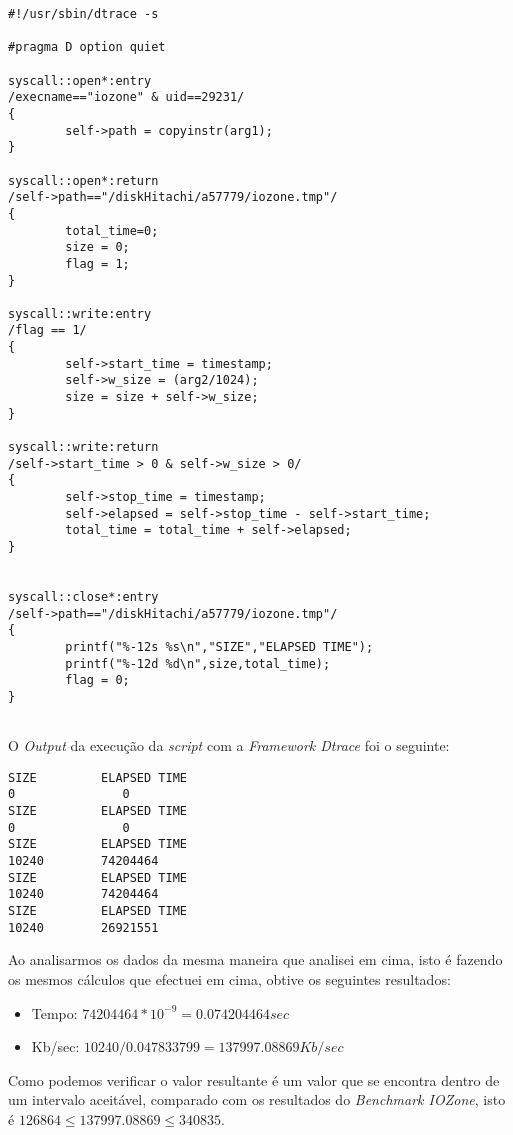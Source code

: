 \documentclass[conference,compsoc]{IEEEtran}
\begin{document}
\begin{lstlisting}
#!/usr/sbin/dtrace -s

#pragma D option quiet

syscall::open*:entry
/execname=="iozone" & uid==29231/
{
        self->path = copyinstr(arg1);
}

syscall::open*:return
/self->path=="/diskHitachi/a57779/iozone.tmp"/
{
        total_time=0;
        size = 0;
        flag = 1; 
}

syscall::write:entry
/flag == 1/
{
        self->start_time = timestamp;
        self->w_size = (arg2/1024);     
        size = size + self->w_size;
}

syscall::write:return
/self->start_time > 0 & self->w_size > 0/
{
        self->stop_time = timestamp;
        self->elapsed = self->stop_time - self->start_time;
        total_time = total_time + self->elapsed; 
}


syscall::close*:entry
/self->path=="/diskHitachi/a57779/iozone.tmp"/
{
        printf("%-12s %s\n","SIZE","ELAPSED TIME");
        printf("%-12d %d\n",size,total_time);
        flag = 0;
}
                                                                                                  
\end{lstlisting}

O \textit{Output} da execução da \textit{script} com a \textit{Framework Dtrace} foi o seguinte:

\begin{lstlisting}
SIZE         ELAPSED TIME
0               0
SIZE         ELAPSED TIME
0               0
SIZE         ELAPSED TIME
10240        74204464
SIZE         ELAPSED TIME
10240        74204464
SIZE         ELAPSED TIME
10240        26921551
\end{lstlisting}

Ao analisarmos os dados da mesma maneira que analisei em cima, isto é fazendo os mesmos cálculos que efectuei em cima, obtive os seguintes resultados: 

\begin{itemize}
\item Tempo: $74204464*10^{-9} = 0.074204464 sec$
\item Kb/sec: $10240/0.047833799=137997.08869 Kb/sec$
\end{itemize}

Como podemos verificar o valor resultante é um valor que se encontra dentro de um intervalo aceitável, comparado com os resultados do \textit{Benchmark IOZone}, isto é $126864 \le 137997.08869 \le 340835$.
\end{document}
